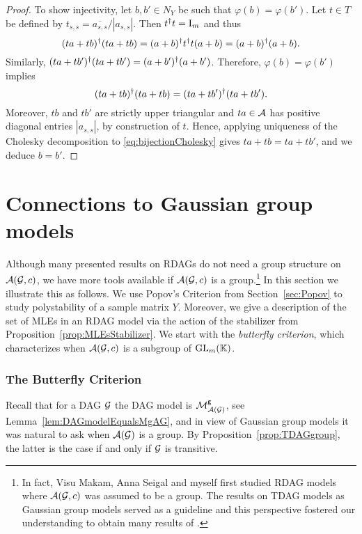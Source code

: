 \begin{proof}
	To show injectivity, let $b, b' \in N_Y$ be such that $\varphi(b) = \varphi(b')$. Let $t \in T$ be defined by $t_{s,s} = \overline{a_{s,s}} / |a_{s,s}|$. Then $t^{\dagger} t = \operatorname{I}_m$ and thus
	\[ (ta + tb)^{\dagger} (ta + tb) = (a+b)^{\dagger} t^{\dagger} t(a+b) = (a+b)^{\dagger} (a+b).\]
	Similarly, $(ta + tb')^{\dagger} (ta + tb') = (a+b')^{\dagger} (a+b')$. Therefore, $\varphi(b) = \varphi(b')$ implies
	\begin{equation}\label{eq:bijectionCholesky}
		(ta + tb)^{\dagger} (ta + tb) = (ta + tb')^{\dagger} (ta + tb').
	\end{equation}
	Moreover, $tb$ and $tb'$ are strictly upper triangular and $ta \in \mathcal{A}$ has positive diagonal entries $|a_{s,s}|$, by construction of $t$. Hence, applying uniqueness of the Cholesky decomposition to \eqref{eq:bijectionCholesky} gives $ta + tb = ta + tb'$, and we deduce $b = b'$.
\end{proof}






\section{Connections to Gaussian group models}\label{sec:RDAGsGaussianGroupModels}


Although many presented results on RDAGs do not need a group structure on $\mathcal{A}(\mathcal{G}, c)$, we have more tools available if $\mathcal{A}(\mathcal{G}, c)$ is a group.\footnote{In fact, Visu Makam, Anna Seigal and myself first studied RDAG models where $\mathcal{A}(\mathcal{G}, c)$ was assumed to be a group. The results on TDAG models as Gaussian group models served as a guideline and this perspective fostered our understanding to obtain many results of \cite{RDAG}.}
In this section we illustrate this as follows. We use Popov's Criterion from Section~\ref{sec:Popov} to study polystability of a sample matrix $Y$. Moreover, we give a description of the set of MLEs in an RDAG model via the action of the stabilizer from Proposition~\ref{prop:MLEsStabilizer}. We start with the \emph{butterfly criterion}, which characterizes when $\mathcal{A}(\mathcal{G}, c)$ is a subgroup of $\operatorname{GL}_m(\mathbb K)$.

\subsubsection{The Butterfly Criterion}

Recall that for a DAG $\mathcal{G}$ the DAG model is $\mathcal{M}^{\mathtt{g}}_{\mathcal{A}(\mathcal{G})}$, see Lemma~\ref{lem:DAGmodelEqualsMgAG}, and in view of Gaussian group models it was natural to ask when $\mathcal{A}(\mathcal{G})$ is a group. By Proposition~\ref{prop:TDAGgroup}, the latter is the case if and only if $\mathcal{G}$ is transitive.

